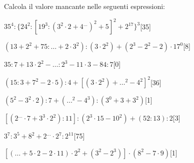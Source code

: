 Calcola il valore mancante nelle seguenti espressioni:

\begin{esercizio} \label{ese:1.17}
$35^4:\{24^2:[19^3:(3^2\cdot2+4^{\dots})^2+5]^2+2^17\}^3$\hfill[35]
\end{esercizio}
\begin{esercizio} \label{ese:1.17}
$(13+2^2+75:{\dots}+2\cdot3^2):(3\cdot2^2)+(2^3-2^2-2)\cdot17^0$\hfill[8]
\end{esercizio}
\begin{esercizio} \label{ese:1.17}
$35:7+13\cdot2^2-{\dots}:2^3-11\cdot3-84:7$\hfill[0]
\end{esercizio}
\begin{esercizio} \label{ese:1.17}
$(15:3+7^2-2\cdot5):4+[(3\cdot2^2)+{\dots}^2-4^2]^2$\hfill[36]
\end{esercizio}
\begin{esercizio} \label{ese:1.17}
$(5^2-3^2\cdot2):7+({\dots}^2-4^3):(3^0+3+3^2)$\hfill[1]
\end{esercizio}
\begin{esercizio} \label{ese:1.17}
$[(2^{\dots}\cdot7+3^3\cdot2^2):11]:(2^3\cdot15-10^2)+(52:13):2$\hfill[3]
\end{esercizio}
\begin{esercizio} \label{ese:1.17}
$3^7:3^5+8^2+2^{\dots}\cdot2^7:2^{11}$\hfill[75]
\end{esercizio}
\begin{esercizio} \label{ese:1.17}
$[({\dots}+5\cdot2-2\cdot11)\cdot2^2+(3^2-2^3)]\cdot(8^2-7\cdot9)$\hfill[1]
\end{esercizio}
